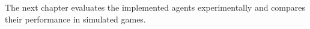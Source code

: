 The next chapter evaluates the implemented agents experimentally and compares their performance in simulated games.

